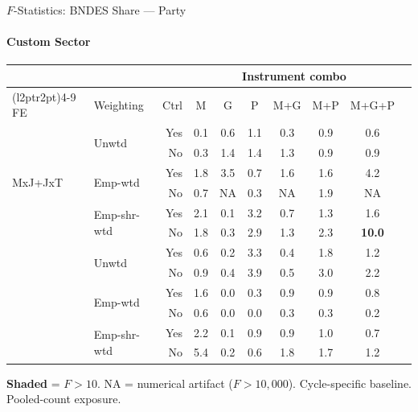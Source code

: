 \documentclass[aspectratio=169,10pt]{beamer}
\newcommand{\fpass}[1]{\cellcolor{pass}\textbf{#1}}
\begin{document}
\begin{frame}[t]{$F$-Statistics: BNDES Share --- Party}
\framesubtitle{Custom Sector}
\begin{center}
\footnotesize
\setlength{\tabcolsep}{3.5pt}
\renewcommand{\arraystretch}{1.05}
\begin{tabular}{@{}llrccccccc@{}}
\toprule
 & & & \multicolumn{6}{c}{Instrument combo} \\
\cmidrule(l{2pt}r{2pt}){4-9}
FE & Weighting & Ctrl & M & G & P & M+G & M+P & M+G+P \\
\midrule
  \multirow{6}{*}{MxJ+JxT} & \multirow{2}{*}{Unwtd} & Yes & 0.1 & 0.6 & 1.1 & 0.3 & 0.9 & 0.6 \\
   &  & No & 0.3 & 1.4 & 1.4 & 1.3 & 0.9 & 0.9 \\
   & \multirow{2}{*}{Emp-wtd} & Yes & 1.8 & 3.5 & 0.7 & 1.6 & 1.6 & 4.2 \\
   &  & No & 0.7 & NA & 0.3 & NA & 1.9 & NA \\
   & \multirow{2}{*}{Emp-shr-wtd} & Yes & 2.1 & 0.1 & 3.2 & 0.7 & 1.3 & 1.6 \\
   &  & No & 1.8 & 0.3 & 2.9 & 1.3 & 2.3 & \fpass{10.0} \\
\addlinespace[5pt]
  \multirow{6}{*}{MxJ+MxT} & \multirow{2}{*}{Unwtd} & Yes & 0.6 & 0.2 & 3.3 & 0.4 & 1.8 & 1.2 \\
   &  & No & 0.9 & 0.4 & 3.9 & 0.5 & 3.0 & 2.2 \\
   & \multirow{2}{*}{Emp-wtd} & Yes & 1.6 & 0.0 & 0.3 & 0.9 & 0.9 & 0.8 \\
   &  & No & 0.6 & 0.0 & 0.0 & 0.3 & 0.3 & 0.2 \\
   & \multirow{2}{*}{Emp-shr-wtd} & Yes & 2.2 & 0.1 & 0.9 & 0.9 & 1.0 & 0.7 \\
   &  & No & 5.4 & 0.2 & 0.6 & 1.8 & 1.7 & 1.2 \\
\bottomrule
\end{tabular}
\end{center}
{\scriptsize \colorbox{pass}{\textbf{Shaded}} = $F>10$. NA = numerical artifact ($F>10{,}000$). Cycle-specific baseline. Pooled-count exposure.}
\end{frame}

\end{document}
